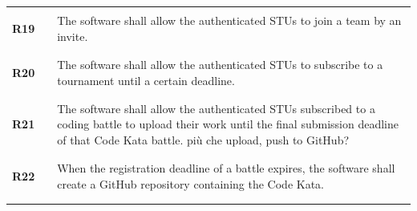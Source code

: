 \begin{longtable}[H]{l l p{12cm}}
                 &        &                                                                                                                                                                                                                             \\\hline & & \\   
    \textbf{R19} & \vline & The software shall allow the authenticated STUs to join a team by an invite.                                                                                                                                                \\
                 &        &                                                                                                                                                                                                                             \\\hline & & \\   
    \textbf{R20} & \vline & The software shall allow the authenticated STUs to subscribe to a tournament until a certain deadline.                                                                                                                      \\
                 &        &                                                                                                                                                                                                                             \\\hline & & \\   
    \textbf{R21} & \vline & The software shall allow the authenticated STUs subscribed to a coding battle to upload their work until the final submission deadline of that Code Kata battle. {\color{red} più che upload, push to GitHub?}              \\
                 &        &                                                                                                                                                                                                                             \\\hline & & \\   
    \textbf{R22} & \vline & When the registration deadline of a battle expires, the software shall create a GitHub repository containing the Code Kata.                                                                                                 \\
                 &        &                                                                                                                                                                                                                             \\\hline & & \\   

\end{longtable}
